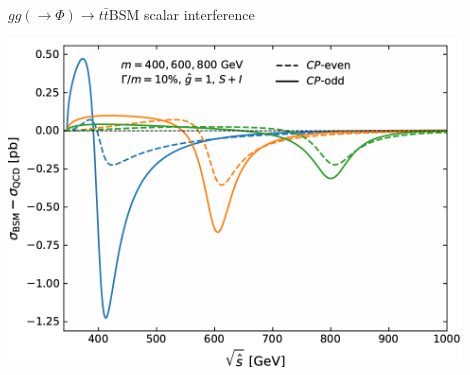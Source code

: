 \documentclass{../bredelebeamer}
\begin{document}
\begin{frame}{$gg (\rightarrow \Phi) \longrightarrow t\bar t$}{BSM scalar interference}
    \begin{center}
        \includegraphics[width=0.9\textwidth]{Interference_Scalars}
    \end{center}
\end{frame}
\end{document}
